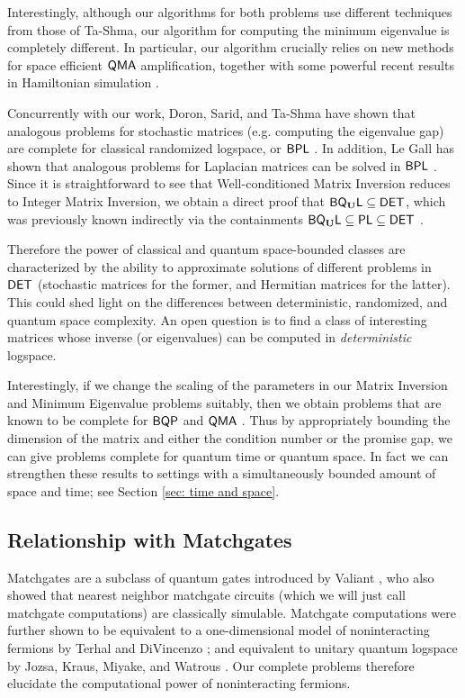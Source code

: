 \documentclass[a4paper,UKenglish]{lipics-v2016}
\newcommand\DET{{\sf{DET}}}
\newcommand\PLclass{{\sf{PL}}}
\newcommand\QMA{{\sf{QMA}}}
\newcommand\BQP{{\sf{BQP}}}
\newcommand\BPL{{\sf{BPL}}}
\newcommand{\classfont}{\sf}
\newcommand{\Unitary}{\mathbf{U}}
\newcommand{\unitaryBQL}{{\classfont{BQ}_\Unitary\classfont{L}}}
\begin{document}
Interestingly, although our algorithms for both problems use different techniques from those of Ta-Shma, our algorithm for computing the minimum eigenvalue is completely different.  In particular, our algorithm crucially relies on new methods for space efficient $\QMA$ amplification, together with some powerful recent results in Hamiltonian simulation \cite{berry14,berry15}.

Concurrently with our work, Doron, Sarid, and Ta-Shma have shown that analogous problems for stochastic matrices (e.g. computing the eigenvalue gap) are complete for classical randomized logspace, or $\BPL$ \cite{dt15,dst16}. In addition, Le Gall has shown that analogous problems for Laplacian matrices can be solved in $\BPL$ \cite{legall16}. Since it is straightforward to see that Well-conditioned Matrix Inversion reduces to Integer Matrix Inversion, we obtain a direct proof that $\unitaryBQL\subseteq\DET$, which was previously known indirectly via the containments $\unitaryBQL\subseteq\PLclass\subseteq\DET$ \cite{Watrous03,Borodin84}.

Therefore the power of classical and quantum space-bounded classes are characterized by the ability to approximate solutions of different problems in $\DET$ (stochastic matrices for the former, and Hermitian matrices for the latter). This could shed light on the differences between deterministic, randomized, and quantum space complexity. An open question is to find a class of interesting matrices whose inverse (or eigenvalues) can be computed in \emph{deterministic} logspace.

Interestingly, if we change the scaling of the parameters in our Matrix Inversion and Minimum Eigenvalue problems suitably, then we obtain problems that are known to be complete for $\BQP$ \cite{HHL} and $\QMA$ \cite{ksv02,at03}.
Thus by appropriately bounding the dimension of the matrix and either the condition number or the promise gap, we can give problems complete for quantum time or quantum space. In fact we can strengthen these results to settings with a simultaneously bounded amount of space and time; see Section \ref{sec: time and space}. 
\subsection{Relationship with Matchgates} \label{sec: matchgates}

Matchgates are a subclass of quantum gates introduced by Valiant \cite{Val02SIComp}, who also showed that nearest neighbor matchgate circuits (which we will just call matchgate computations) are classically simulable. Matchgate computations were further shown to be equivalent to a one-dimensional model of noninteracting fermions by Terhal and DiVincenzo \cite{TerDiV02PRA}; and equivalent to unitary quantum logspace by Jozsa, Kraus, Miyake, and Watrous \cite{JozKraMiyWat10RSPA}. Our complete problems therefore elucidate the computational power of noninteracting fermions.
\end{document}
